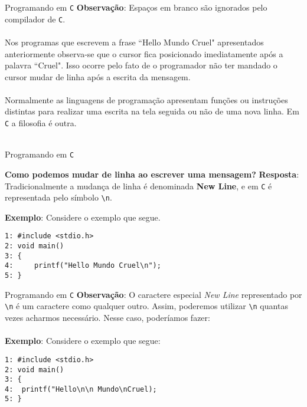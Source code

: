 \documentclass{beamer}
\newcommand{\C}{\texttt{C}}
\newcommand{\barra}{\textbackslash}
\begin{document}
\begin{frame}{Programando em \C}
\textbf{Observação}: Espaços em branco são ignorados pelo compilador de \C.\\~\\

Nos programas que escrevem a frase ``Hello Mundo Cruel" apresentados anteriormente observa-se que o cursor fica posicionado imediatamente após a palavra ``Cruel". Isso ocorre pelo fato de o programador não ter mandado o cursor mudar de linha após a escrita da mensagem.\\~\\

Normalmente as linguagens de programação apresentam funções ou instruções distintas para realizar uma escrita na tela seguida ou não de uma nova linha. Em \texttt{C} a filosofia é outra.\\~\\
\end{frame}

\begin{frame}[fragile]{Programando em \C}
\begin{block}{\textbf{Como podemos mudar de linha ao escrever uma mensagem?}}
	\textbf{Resposta}: Tradicionalmente a mudança de linha é denominada \textbf{New Line}, e em \texttt{C} é representada pelo símbolo \texttt{\barra n}.
\end{block}

\textbf{Exemplo}: Considere o exemplo que segue.
\begin{verbatim}
1: #include <stdio.h>
2: void main()
3: {
4:     printf("Hello Mundo Cruel\n");
5: }
\end{verbatim}
\end{frame} 

\begin{frame}[fragile]{Programando em \C}
\textbf{Observação}: O caractere especial \textit{New Line} representado por \texttt{\barra n} é um caractere como qualquer outro. Assim, poderemos utilizar \texttt{\barra n} quantas vezes acharmos necessário. Nesse caso, poderíamos fazer:\\~\\

\textbf{Exemplo}: Considere o exemplo que segue:

\begin{verbatim}
1: #include <stdio.h>
2: void main()
3: {
4: 	printf("Hello\n\n Mundo\nCruel);
5: }
\end{verbatim}
\end{frame}
\end{document}
